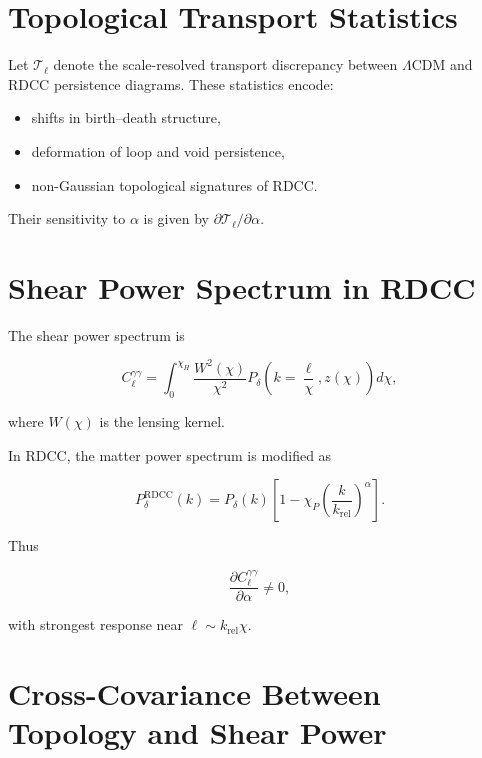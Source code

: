 \documentclass[11pt,a4paper]{article}
\begin{document}
\section{Topological Transport Statistics}

Let $\mathcal{T}_{\ell}$ denote the scale-resolved transport discrepancy between 
$\Lambda$CDM and RDCC persistence diagrams. These statistics encode:

\begin{itemize}
    \item shifts in birth–death structure,
    \item deformation of loop and void persistence,
    \item non-Gaussian topological signatures of RDCC.
\end{itemize}

Their sensitivity to $\alpha$ is given by 
$\partial \mathcal{T}_{\ell} / \partial \alpha$.
\section{Shear Power Spectrum in RDCC}

The shear power spectrum is

\begin{equation}
    C_\ell^{\gamma\gamma}
    =
    \int_{0}^{\chi_H}
    \frac{W^{2}(\chi)}{\chi^{2}}
    P_{\delta}\!\left(k=\frac{\ell}{\chi}, z(\chi)\right)
    d\chi,
\end{equation}

where $W(\chi)$ is the lensing kernel.

In RDCC, the matter power spectrum is modified as

\begin{equation}
    P_{\delta}^{\mathrm{RDCC}}(k)
    =
    P_{\delta}(k)
    \left[
        1 - \chi_{P}
        \left(\frac{k}{k_{\mathrm{rel}}}\right)^{\alpha}
    \right].
\end{equation}

Thus



\[
    \frac{\partial C_\ell^{\gamma\gamma}}{\partial \alpha}
    \neq 0,
\]



with strongest response near $\ell \sim k_{\mathrm{rel}}\chi$.
\section{Cross-Covariance Between Topology and Shear Power}
\end{document}
